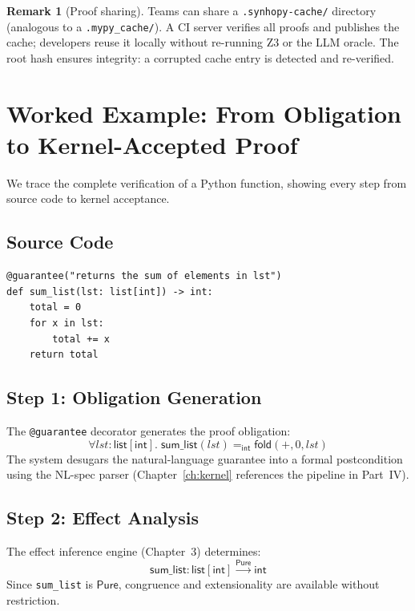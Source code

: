 \documentclass[11pt,a4paper]{report}
\theoremstyle{definition}
\newtheorem{remark}[definition]{Remark}
\theoremstyle{plain}
\newcommand{\Pure}{\mathsf{Pure}}
\begin{document}
\begin{remark}[Proof sharing]
Teams can share a \texttt{.synhopy-cache/} directory (analogous to a
\texttt{.mypy\_cache/}). A CI server verifies all proofs and publishes
the cache; developers reuse it locally without re-running Z3 or the
LLM oracle. The root hash ensures integrity: a corrupted cache entry
is detected and re-verified.
\end{remark}


\section{Worked Example: From Obligation to Kernel-Accepted Proof}
\label{sec:worked-example}

We trace the complete verification of a Python function, showing every
step from source code to kernel acceptance.

\subsection{Source Code}

\begin{lstlisting}[style=synhopy]
@guarantee("returns the sum of elements in lst")
def sum_list(lst: list[int]) -> int:
    total = 0
    for x in lst:
        total += x
    return total
\end{lstlisting}

\subsection{Step 1: Obligation Generation}

The \lstinline[style=synhopy]|@guarantee| decorator generates the proof
obligation:
\[
  \forall \mathit{lst} : \mathsf{list}[\mathsf{int}].\;
    \mathsf{sum\_list}(\mathit{lst}) =_{\mathsf{int}}
    \mathsf{fold}(+, 0, \mathit{lst})
\]
The system desugars the natural-language guarantee into a formal
postcondition using the NL-spec parser
(Chapter~\ref{ch:kernel} references the pipeline in Part~IV).

\subsection{Step 2: Effect Analysis}

The effect inference engine (Chapter~3) determines:
\[
  \mathsf{sum\_list} : \mathsf{list}[\mathsf{int}]
    \xrightarrow{\Pure} \mathsf{int}
\]
Since \lstinline[style=synhopy]|sum_list| is $\Pure$, congruence and
extensionality are available without restriction.
\end{document}
